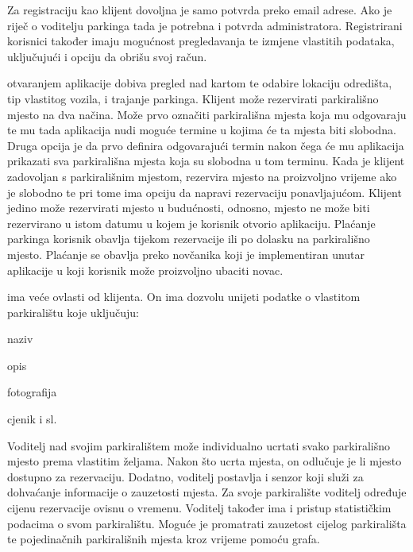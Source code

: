 		Za registraciju kao klijent dovoljna je samo potvrda preko email adrese. Ako je riječ o voditelju parkinga tada je potrebna i potvrda administratora. Registrirani korisnici također imaju mogućnost pregledavanja te izmjene vlastitih podataka, uključujući i opciju da obrišu svoj račun.
		
		   otvaranjem aplikacije dobiva pregled nad kartom te odabire lokaciju odredišta, tip vlastitog vozila, i trajanje parkinga. Klijent može rezervirati parkirališno mjesto na dva načina. Može prvo označiti parkirališna mjesta koja mu odgovaraju te mu tada aplikacija nudi moguće termine u kojima će ta mjesta biti slobodna. Druga opcija je da prvo definira odgovarajući termin nakon čega će mu aplikacija prikazati sva parkirališna mjesta koja su slobodna u tom terminu. Kada je klijent zadovoljan s parkirališnim mjestom, rezervira mjesto na proizvoljno vrijeme ako je slobodno te pri tome ima opciju da napravi rezervaciju ponavljajućom. Klijent jedino može rezervirati mjesto u budućnosti, odnosno, mjesto ne može biti rezervirano u istom datumu u kojem je korisnik otvorio aplikaciju. Plaćanje parkinga korisnik obavlja tijekom rezervacije ili po dolasku na parkirališno mjesto. Plaćanje se obavlja preko novčanika koji je implementiran unutar aplikacije u koji korisnik može proizvoljno ubaciti novac. 
		
		  ima veće ovlasti od klijenta. On ima dozvolu unijeti podatke o vlastitom parkiralištu koje uključuju:
		  
		  
		 
		 \begin{packed_item}
		 	\item naziv
		 	\item opis
		 	\item fotografija
		 	\item cjenik i sl.
		 \end{packed_item}
		
		\noindent Voditelj nad svojim parkiralištem može individualno ucrtati svako parkirališno mjesto prema vlastitim željama. Nakon što ucrta mjesta, on odlučuje je li mjesto dostupno za rezervaciju. Dodatno, voditelj postavlja i senzor koji služi za dohvaćanje informacije o zauzetosti mjesta. Za svoje parkiralište voditelj određuje cijenu rezervacije ovisnu o vremenu. Voditelj također ima i pristup statističkim podacima o svom parkiralištu. Moguće je promatrati zauzetost cijelog parkirališta te pojedinačnih parkirališnih mjesta kroz vrijeme pomoću grafa.
		
